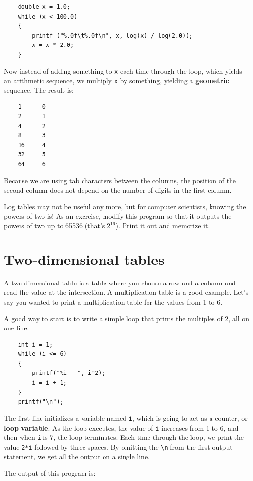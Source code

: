 \begin{verbatim}
    double x = 1.0;
    while (x < 100.0) 
    {
        printf ("%.0f\t%.0f\n", x, log(x) / log(2.0));
        x = x * 2.0;
    }
\end{verbatim}
%
Now instead of adding something to {\tt x} each time through
the loop, which yields an arithmetic sequence, we multiply
{\tt x} by something, yielding a {\bf geometric} sequence.
The result is:

\begin{verbatim}
    1      0
    2      1
    4      2
    8      3
    16     4
    32     5
    64     6
\end{verbatim}
%
Because we are using tab characters between the columns, the
position of the second column does not depend on the number
of digits in the first column.

Log tables may not be useful any more, but for computer scientists,
knowing the powers of two is!  As an exercise, modify this program
so that it outputs the powers of two up to 65536
(that's $2^{16}$).  Print it out and memorize it.

\section{Two-dimensional tables}

A two-dimensional table is a table where you choose a row and
a column and read the value at the intersection.  A multiplication
table is a good example.  Let's say you wanted to print a
multiplication table for the values from 1 to 6.

A good way to start is to write a simple loop that prints
the multiples of 2, all on one line.

\begin{verbatim}
    int i = 1;
    while (i <= 6) 
    {
        printf("%i   ", i*2);
        i = i + 1;
    }
    printf("\n");
\end{verbatim}
%
The first line initializes a variable named {\tt i}, which is
going to act as a counter, or {\bf loop variable}.  As the
loop executes, the value of {\tt i} increases from 1 to 6,
and then when {\tt i} is 7, the loop terminates.  Each
time through the loop, we print the value {\tt 2*i} followed
by three spaces.  By omitting the  \verb+\n+ from the
first output statement, we get 
all the output on a single line.


The output of this program is:

